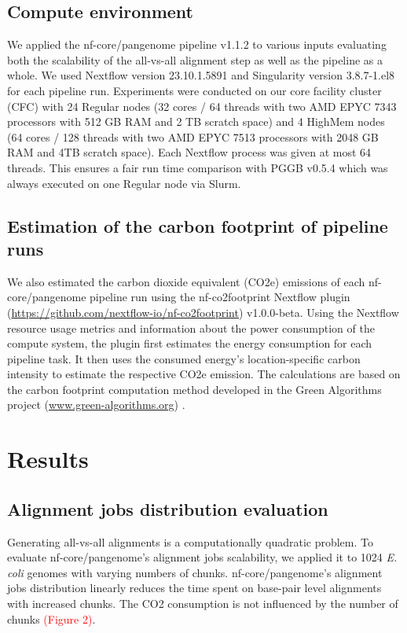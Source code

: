 \documentclass{bioinfo}
\theoremstyle{definition}
\newcommand{\red}[1]{{\textcolor{Red}{#1}}}
\begin{document}
	\subsection{Compute environment}
	
	We applied the nf-core/pangenome pipeline v1.1.2 to various inputs evaluating both the scalability of the all-vs-all alignment step as well as the pipeline as a whole. 
	We used Nextflow version 23.10.1.5891 and Singularity version 3.8.7-1.el8 for each pipeline run. 
	Experiments were conducted on our core facility cluster (CFC) with 24 Regular nodes (32 cores / 64 threads with two AMD EPYC 7343 processors with 512 GB RAM and 2 TB scratch space) and 4 HighMem nodes (64 cores / 128 threads with two AMD EPYC 7513 processors with 2048 GB RAM and 4TB scratch space). 
	Each Nextflow process was given at most 64 threads. This ensures a fair run time comparison with PGGB v0.5.4 which was always executed on one Regular node via Slurm.
	
	\subsection{Estimation of the carbon footprint of pipeline runs}
	
	We also estimated the carbon dioxide equivalent (CO2e) emissions of each nf-core/pangenome pipeline run using the nf-co2footprint Nextflow plugin (\href{https://github.com/nextflow-io/nf-co2footprint}{https://github.com/nextflow-io/nf-co2footprint}) v1.0.0-beta. 
	Using the Nextflow resource usage metrics and information about the power consumption of the compute system, the plugin first estimates the energy consumption for each pipeline task. 
	It then uses the consumed energy's location-specific carbon intensity to estimate the respective CO2e emission.
	The calculations are based on the carbon footprint computation method developed in the Green Algorithms project (\href{www.green-algorithms.org}{www.green-algorithms.org}) \citep{Lannelongue2021}.
	
	\section{Results}
	
	\subsection{Alignment jobs distribution evaluation}
	
	Generating all-vs-all alignments is a computationally quadratic problem. 
	To evaluate nf-core/pangenome’s alignment jobs scalability, we applied it to 1024 \textit{E. coli} genomes with varying numbers of chunks. 
	nf-core/pangenome’s alignment jobs distribution linearly reduces the time spent on base-pair level alignments with increased chunks.
	The CO2 consumption is not influenced by the number of chunks \red{(Figure 2)}.
		
\end{document}
